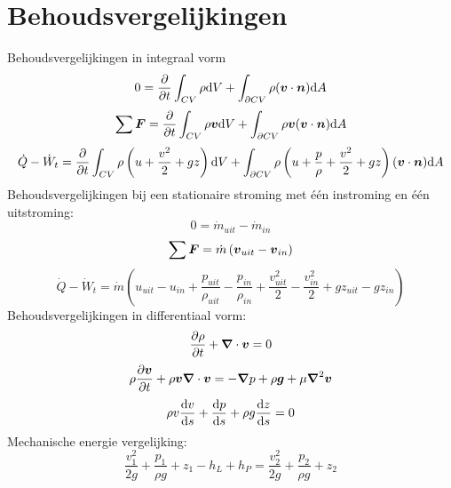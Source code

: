 	\section{Behoudsvergelijkingen}
Behoudsvergelijkingen in integraal vorm
\begin{equation}
	0 = \frac{\partial}{\partial t} \int_{CV} \rho \mathrm{d} V + \int_{\partial CV} \rho (\boldsymbol{v}\cdot \boldsymbol{n}) \mathrm{d} A
\end{equation}
\begin{equation}
	\sum \boldsymbol{F} = \frac{\partial}{\partial t} \int_{CV} \rho \boldsymbol{v} \mathrm{d} V + \int_{\partial CV} \rho \boldsymbol{v} (\boldsymbol{v}\cdot \boldsymbol{n}) \mathrm{d} A
\end{equation}
\begin{equation}
	\dot{Q}-\dot{W}_t = \frac{\partial}{\partial t} \int_{CV} \rho \left(u+\frac{v^2}{2}+g z \right) \mathrm{d} V + \int_{\partial CV} \rho \left(u+\frac{p}{\rho}+\frac{v^2}{2}+g z \right) (\boldsymbol{v}\cdot \boldsymbol{n}) \mathrm{d} A
\end{equation}
Behoudsvergelijkingen bij een stationaire stroming met één instroming en één uitstroming:
\begin{equation}
	0 = \dot{m}_{uit}-\dot{m}_{in}
\end{equation}
\begin{equation}
	\sum \boldsymbol{F} = \dot{m} \left( \boldsymbol{v}_{uit}-\boldsymbol{v}_{in} \right)
\end{equation}
\begin{equation}
	\dot{Q}-\dot{W}_t = \dot{m} \left(u_{uit}-u_{in}+\frac{p_{uit}}{\rho_{uit}}-\frac{p_{in}}{\rho_{in}}+\frac{v_{uit}^2}{2}-\frac{v_{in}^2}{2}+g z_{uit}-g z_{in} \right)
\end{equation}
Behoudsvergelijkingen in differentiaal vorm:
\begin{equation}
	\frac{\partial \rho}{\partial t} + \boldsymbol{\nabla} \cdot \boldsymbol{v} = 0
\end{equation}
\begin{equation}
	\rho \frac{\partial \boldsymbol{v}}{\partial t} + \rho \boldsymbol{v} \boldsymbol{\nabla} \cdot \boldsymbol{v} = -\boldsymbol{\nabla} p + \rho \boldsymbol{g} + \mu \boldsymbol{\nabla}^2 \boldsymbol{v}
\end{equation}
\begin{equation}
	\rho v \frac{\mathrm{d} v}{\mathrm{d} s} + \frac{\mathrm{d} p}{\mathrm{d} s} + \rho g \frac{\mathrm{d} z}{\mathrm{d} s} = 0
\end{equation}
Mechanische energie vergelijking:
\begin{equation}
	\frac{v_1^2}{2g} + \frac{p_1}{\rho g} + z_1 - h_L + h_P = \frac{v_2^2}{2g} + \frac{p_2}{\rho g} + z_2
\end{equation}

